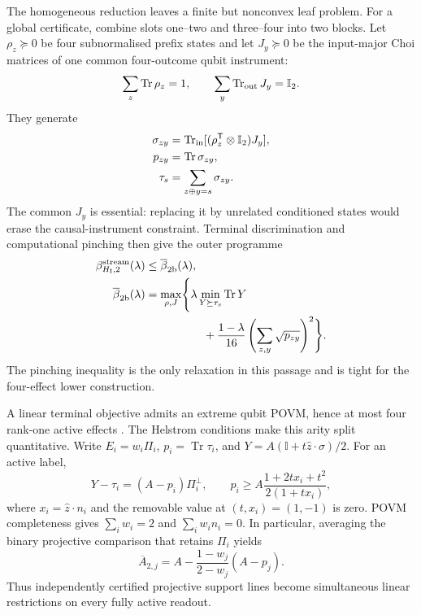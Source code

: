 \documentclass[10pt,twocolumn]{article}
\theoremstyle{remark}
\newcommand{\Tr}{\operatorname{Tr}}
\newcommand{\id}{\mathbb I}
\begin{document}
The homogeneous reduction leaves a finite but nonconvex leaf problem. For a
global certificate, combine slots one--two and three--four into two blocks.
Let $\rho_z\succeq0$ be four subnormalised prefix states and let $J_y\succeq0$
be the input-major Choi matrices of one common four-outcome qubit instrument:
\begin{equation}
\sum_z\Tr\rho_z=1,
\qquad
\sum_y\Tr_{\rm out}J_y=\id_2.
\label{eq:two-block-normalisation}
\end{equation}
They generate
\begin{equation}
\begin{aligned}
\sigma_{zy}
  &=\Tr_{\rm in}[(\rho_z^{\mathsf T}\otimes\id_2)J_y],\\
p_{zy}&=\Tr\sigma_{zy},\\
\tau_s&=\sum_{z\oplus y=s}\sigma_{zy}.
\end{aligned}
\label{eq:two-block-states}
\end{equation}
The common $J_y$ is essential: replacing it by unrelated conditioned states
would erase the causal-instrument constraint. Terminal discrimination and
computational pinching then give the outer programme
\begin{equation}
\begin{split}
\beta^{\rm stream}_{H_{\rm I},2}(\lambda)
&\leq\overline\beta_{2\rm b}(\lambda),\\
\overline\beta_{2\rm b}(\lambda)
&=\max_{\rho,J}\Biggl\{
 \lambda\min_{Y\succeq\tau_s}\Tr Y\\
&\hspace{1.8cm}
+\frac{1-\lambda}{16}
  \left(\sum_{z,y}\sqrt{p_{zy}}\right)^2
\Biggr\}.
\end{split}
\label{eq:two-block-outer}
\end{equation}
The pinching inequality is the only relaxation in this passage and is tight
for the four-effect lower construction.

A linear terminal objective admits an extreme qubit POVM, hence at most four
rank-one active effects \cite{darianolo2005extremal}. The Helstrom conditions
make this arity split quantitative. Write
$E_i=w_i\Pi_i$, $p_i=\Tr\tau_i$, and
$Y=A(\id+t\hat z\cdot\sigma)/2$. For an active label,
\begin{equation}
Y-\tau_i=(A-p_i)\Pi_i^\perp,
\qquad
p_i\geq A\frac{1+2tx_i+t^2}{2(1+tx_i)},
\label{eq:helstrom-reconstruction}
\end{equation}
where $x_i=\hat z\cdot n_i$ and the removable value at $(t,x_i)=(1,-1)$
is zero. POVM completeness gives
$\sum_iw_i=2$ and $\sum_iw_i n_i=0$. In particular, averaging the binary
projective comparison that retains $\Pi_i$ yields
\begin{equation}
\overline A_{2,j}
=A-\frac{1-w_j}{2-w_j}(A-p_j).
\label{eq:projective-comparison}
\end{equation}
Thus independently certified projective support lines become simultaneous
linear restrictions on every fully active readout.
\end{document}
